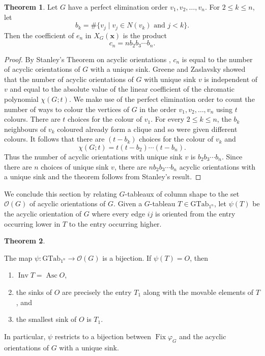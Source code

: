 \documentclass[12pt]{amsart}  %
\theoremstyle{definition}
\newtheorem{theorem}{Theorem}[section]
\theoremstyle{remark}
\numberwithin{equation}{section}
\DeclareMathOperator{\Asc}{Asc}
\DeclareMathOperator{\Inv}{Inv}
\DeclareMathOperator{\Fix}{Fix}
\begin{document}
\begin{theorem}
\label{e_n:q=1}
Let $G$ have a perfect elimination order $v_1,v_2,\ldots, v_n$.  
 For $2\leq k\leq n$, let 
$$
b_k=\#\{ v_j \mid \text{$v_j\in N(v_k)$ and $j<k$}\}.
$$
Then the coefficient of $e_n$ in $X_G(\bm x)$ is the product
$$
c_n=n b_2 b_3 \cdots b_n.
$$
\end{theorem}
\begin{proof}
By Stanley's Theorem on acyclic orientations \cite[Theorem 3.3]{chromsym}, $c_n$ is equal to the number of acyclic orientations of $G$ with a unique sink. Greene and Zaslavsky \cite[Theorem 7.3]{interpwhitney} showed that the number of acyclic orientations of $G$ with unique sink $v$ is independent of $v$ and equal to the absolute value of the linear coefficient of the chromatic polynomial $\chi(G;t)$. We make use of the perfect elimination order to count the number of ways to colour the vertices of $G$ in the order $v_1,v_2,\ldots,v_n$ using $t$ colours. There are $t$ choices for the colour of $v_1$. For every $2\leq k\leq n$, the $b_k$ neighbours of $v_k$ coloured already form a clique and so were given different colours.
It follows that there are $(t-b_k)$ choices for the colour of $v_k$ and
$$\chi(G;t)=t(t-b_2)\cdots(t-b_n).$$
Thus the number of acyclic orientations with unique sink $v$ is $b_2b_3\cdots b_n$. Since there are $n$ choices of unique sink $v$, there are $nb_2b_3\cdots b_n$ acyclic orientations with a unique sink and the theorem follows from Stanley's result.
\end{proof}

We conclude this section by relating $G$-tableaux of column shape to the set $\mathcal O(G)$ of acyclic orientations of $G$. Given a $G$-tableau $T\in\text{GTab}_{1^n}$, let $\psi(T)$ be the acyclic orientation of $G$ where every edge $ij$ is oriented from the entry occurring lower in $T$ to the entry occurring higher.

\begin{theorem}\label{thm:aotabs}

The map $\psi:\text{GTab}_{1^n}\rightarrow \mathcal O(G)$ is a bijection. If $\psi(T)=O$, then 
\begin{enumerate}
    \item[(a)] $\Inv T=\Asc O$,
    \item[(b)] the sinks of $O$ are precisely the entry $T_1$ along with the movable elements of $T$, and
    \item[(c)] the smallest sink of $O$ is $T_1$. 
\end{enumerate}

In particular, $\psi$ restricts to a bijection between $\Fix\varphi_G$ and the acyclic orientations of $G$ with a unique sink. 
\end{theorem}
\end{document}
